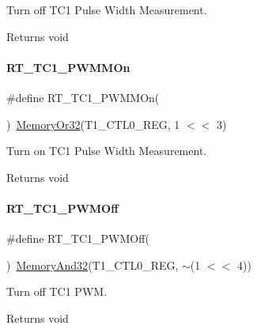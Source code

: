 Turn off T\+C1 Pulse Width Measurement. 

\begin{DoxyReturn}{Returns}
void 
\end{DoxyReturn}
\mbox{\label{a00044_a6f11e47b5a8e7947fc76e9955e94acea}} 
\paragraph{\texorpdfstring{R\+T\+\_\+\+T\+C1\+\_\+\+P\+W\+M\+M\+On}{RT\_TC1\_PWMMOn}}
{\footnotesize\ttfamily \#define R\+T\+\_\+\+T\+C1\+\_\+\+P\+W\+M\+M\+On(\begin{DoxyParamCaption}{ }\end{DoxyParamCaption})~\mbox{\hyperlink{a00020_a9ea92ebccdef6bdaca4d00210cc7266d}{Memory\+Or32}}(T1\+\_\+\+C\+T\+L0\+\_\+\+R\+EG, 1 $<$$<$ 3)}



Turn on T\+C1 Pulse Width Measurement. 

\begin{DoxyReturn}{Returns}
void 
\end{DoxyReturn}
\mbox{\label{a00044_afbffb90a80851e9a1e6e3dc03938c547}} 
\paragraph{\texorpdfstring{R\+T\+\_\+\+T\+C1\+\_\+\+P\+W\+M\+Off}{RT\_TC1\_PWMOff}}
{\footnotesize\ttfamily \#define R\+T\+\_\+\+T\+C1\+\_\+\+P\+W\+M\+Off(\begin{DoxyParamCaption}{ }\end{DoxyParamCaption})~\mbox{\hyperlink{a00020_a5c1a2bd4c1bd4c2f429d8042a45327ff}{Memory\+And32}}(T1\+\_\+\+C\+T\+L0\+\_\+\+R\+EG, $\sim$(1 $<$$<$ 4))}



Turn off T\+C1 P\+WM. 

\begin{DoxyReturn}{Returns}
void 
\end{DoxyReturn}
\mbox{\label{a00044_a66b006ccc7fcf8165e1bed013985b92e}} 
